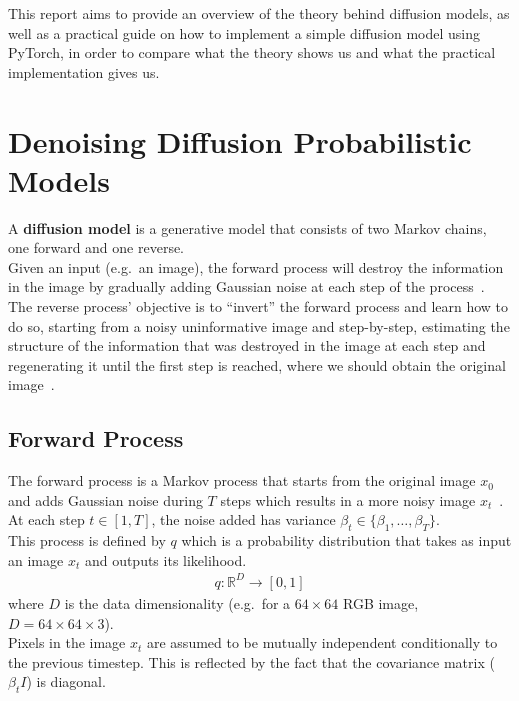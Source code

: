 \documentclass[twoside]{article}
\numberwithin{equation}{section}
\numberwithin{figure}{section}
\begin{document}
This report aims to provide an overview of the theory behind diffusion models, as well as a practical guide on how to implement a simple diffusion model using PyTorch, in order to compare what the theory shows us and what the practical implementation gives us.

\newpage
\section{Denoising Diffusion Probabilistic Models}
A \textbf{diffusion model} is a generative model that consists of two Markov chains, one forward and one reverse. \\
Given an input (e.g.\ an image), the forward process will destroy the information in the image by gradually adding Gaussian noise at each step of the process~\cite{ho2020denoising}. \\
The reverse process' objective is to ``invert'' the forward process and learn how to do so, starting from a noisy uninformative image and step-by-step, estimating the structure of the information that was destroyed in the image at each step and regenerating it until the first step is reached, where we should obtain the original image~\cite{ho2020denoising}.

\subsection{Forward Process}

The forward process is a Markov process that starts from the original image $x_0$ and adds Gaussian noise during $T$ steps which results in a more noisy image $x_t$~\cite{ho2020denoising}. \\
At each step $t \in \left[1, T\right]$, the noise added has variance $\beta_t \in \{ \beta_1, \dots, \beta_T \}$. \\ 
This process is defined by $q$ which is a probability distribution that takes as input an image $x_{t}$ and outputs its likelihood.
\begin{align}
  q: \mathbb{R}^D \rightarrow [0, 1]
\end{align}
where $D$ is the data dimensionality (e.g.\ for a $64 \times 64$ RGB image, $D = 64 \times 64 \times 3$). \\
Pixels in the image $x_t$ are assumed to be mutually independent conditionally to the previous timestep. This is reflected by the fact that the covariance matrix ($\beta_t I$) is diagonal.
\end{document}
